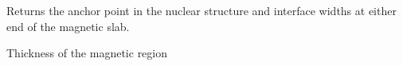 \documentclass[letterpaper,10pt,english]{sphinxmanual}
\begin{document}
\begin{fulllineitems}
\begin{fulllineitems}
Returns the anchor point in the nuclear structure and interface
widths at either end of the magnetic slab.

\end{fulllineitems}


\begin{fulllineitems}
\label{api/magnetic:refl1d.magnetic.MagneticSlab.thickness}
Thickness of the magnetic region

\end{fulllineitems}


\begin{fulllineitems}
\label{api/magnetic:refl1d.magnetic.MagneticSlab.thicknessM}
\end{fulllineitems}


\end{fulllineitems}

\end{document}
